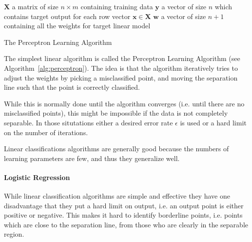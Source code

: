 \begin{algorithm}
  \begin{algorithmic}[1]
    \Require $\mathbf{X}$ a matrix of size $n\times m$ containing training data
    \Require $\mathbf{y}$ a vector of size $n$ which contains target output for each row vector $\mathbf{x} \in \mathbf{X}$
    \Ensure $\mathbf{w}$ a vector of size $n+1$ containing all the weights for target linear model
    \Repeat
    \EndFor
    \EndFunction
  \end{algorithmic}
  \caption{The Perceptron Learning Algorithm}\label{alg:perceptron}
\end{algorithm}

The simplest linear algorithm is called the Perceptron Learning Algorithm (see Algorithm~\ref{alg:perceptron}). 
The idea is that the algorithm iteratively tries to adjust the weights by picking a misclassified point, and moving the separation line
such that the point is correctly classified. 

While this is normally done until the algorithm converges (i.e. until there are no misclassified points),
this might be impossible if the data is not completely separable.
In those situtations either a desired error rate $\epsilon$ is used or a hard limit on the number of iterations.

Linear classifications algorithms are generally good because the numbers of learning parameters are few, and thus they generalize well.

\paragraph{Logistic Regression}
\label{par:LogisticRegression}
While linear classification algorithms are simple and effective they have one disadvantage that they put a hard limit on output,
i.e. an output point is either positive or negative.
This makes it hard to identify borderline points, i.e. points which are close to the separation line, from those who are clearly in the separable region.

